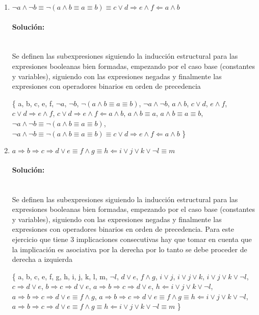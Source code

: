 \documentclass{article}
\newcommand{\myparagraph}[1]{\paragraph{#1}\mbox{}\\}
\begin{document}
\begin{enumerate}
\begin{enumerate}
		\item $\neg a \land \neg b \equiv \neg(a \land b \equiv a \equiv b) \equiv c \lor d \Rightarrow e \land f \Leftarrow a \land b$

			\myparagraph{Solución:}
			\textlangle{} Se definen las subexpresiones siguiendo la inducción estructural para las expresiones booleanas bien formadas, empezando por el caso base (constantes y variables), siguiendo con las expresiones negadas y finalmente las expresiones con operadores binarios en orden de precedencia \textrangle\par
			\{ a, b, c, e, f, $\neg a$, $\neg b$, $\neg(a \land b \equiv a \equiv b)$, $\neg a \land \neg b$, $a \land b$, $c \lor d$, $e \land f$, $c \lor d \Rightarrow e \land f$, $c \lor d \Rightarrow e \land f \Leftarrow a \land b$, $a \land b \equiv a$, $a \land b \equiv a \equiv b$, $\neg a \land \neg b \equiv \neg(a \land b \equiv a \equiv b)$, $\neg a \land \neg b \equiv \neg(a \land b \equiv a \equiv b) \equiv c \lor d \Rightarrow e \land f \Leftarrow a \land b$ \}
			\hspace{0.8cm}

		\item $a \Rightarrow b \Rightarrow c \Rightarrow d \lor e \equiv f \land g \equiv h \Leftarrow i \lor j \lor k \lor \neg l \equiv m$
		
			\myparagraph{Solución:}
			\textlangle{} Se definen las subexpresiones siguiendo la inducción estructural para las expresiones booleanas bien formadas, empezando por el caso base (constantes y variables), siguiendo con las expresiones negadas y finalmente las expresiones con operadores binarios en orden de precedencia. Para este ejercicio que tiene 3 implicaciones consecutivas hay que tomar en cuenta que la implicación es asociativa por la derecha por lo tanto se debe proceder de derecha a izquierda \textrangle\par
			\{ a, b, c, e, f, g, h, i, j, k, l, m, $\neg l$, $d \lor e$, $f \land g$, $i \lor j$, $i \lor j \lor k$, $i \lor j \lor k \lor \neg l$, $c \Rightarrow d \lor e $, $b \Rightarrow c \Rightarrow d \lor e $, $a \Rightarrow b \Rightarrow c \Rightarrow d \lor e $, $h \Leftarrow i \lor j \lor k \lor \neg l$, $a \Rightarrow b \Rightarrow c \Rightarrow d \lor e \equiv f \land g$, $a \Rightarrow b \Rightarrow c \Rightarrow d \lor e \equiv f \land g \equiv h \Leftarrow i \lor j \lor k \lor \neg l$, $a \Rightarrow b \Rightarrow c \Rightarrow d \lor e \equiv f \land g \equiv h \Leftarrow i \lor j \lor k \lor \neg l \equiv m$  \}
			\hspace{0.8cm}


\end{enumerate}
\end{enumerate}
\end{document}
